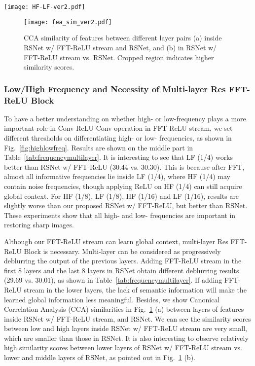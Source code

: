 \documentclass[letterpaper]{article} \usepackage{aaai23}  \usepackage{times}  \usepackage{helvet}  \usepackage{courier}  \usepackage[hyphens]{url}  \usepackage{graphicx} \usepackage{enumitem}
\begin{document}
\begin{figure*}[t]
\begin{center}
    \texttt{[image: HF-LF-ver2.pdf]}
\end{center}
\caption{Illustration on differentiating high- and low-frequencies. Although the operation of keeping high- or low-frequency is applied on features, corresponding images are shown for reference. Best viewed electronically, zoom in.} 
\label{fig:highlowfreq}
\end{figure*}

\begin{figure}[t]
\begin{center}
    \texttt{[image: fea\_sim\_ver2.pdf]}
\end{center}
\caption{CCA similarity of features between different layer pairs (a) inside RSNet w/ FFT-ReLU stream and RSNet, and (b) in RSNet w/ FFT-ReLU stream vs. RSNet. Cropped region indicates higher similarity scores.} 
\label{fig:fea_sim}
\end{figure}

\subsubsection{Low/High Frequency and Necessity of Multi-layer Res FFT-ReLU Block}
To have a better understanding on whether high- or low-frequency plays a more important role in Conv-ReLU-Conv operation in FFT-ReLU stream, we set different thresholds on differentiating high- or low- frequencies, as shown in Fig.~\ref{fig:highlowfreq}. Results are shown on the middle part in Table~\ref{tab:frequencymultilayer}. It is interesting to see that LF (1/4) works better than RSNet w/ FFT-ReLU (30.44 vs. 30.30). This is because after FFT, almost all informative frequencies lie inside LF (1/4), where HF (1/4) may contain noise frequencies, though applying ReLU on HF (1/4) can still acquire global context. For HF (1/8), LF (1/8), HF (1/16) and LF (1/16), results are slightly worse than our proposed RSNet w/ FFT-ReLU, but better than RSNet. These experiments show that all high- and low- frequencies are important in restoring sharp images.

Although our FFT-ReLU stream can learn global context, multi-layer Res FFT-ReLU Block is necessary. Multi-layer can be considered as progressively deblurring the output of the previous layers. Adding FFT-ReLU stream in the first 8 layers and the last 8 layers in RSNet obtain different deblurring results (29.69 vs. 30.01), as shown in Table~\ref{tab:frequencymultilayer}. If adding FFT-ReLU stream in the lower layers, the lack of semantic information will make the learned global information less meaningful. Besides, we show Canonical Correlation Analysis (CCA) similarities in Fig.~\ref{fig:fea_sim} (a) between layers of features inside RSNet w/ FFT-ReLU stream, and RSNet. We can see the similarity scores between low and high layers inside RSNet w/ FFT-ReLU stream are very small, which are smaller than those in RSNet. It is also interesting to observe relatively high similarity scores between lower layers of RSNet w/ FFT-ReLU stream vs. lower and middle layers of RSNet, as pointed out in Fig.~\ref{fig:fea_sim} (b).
\end{document}
